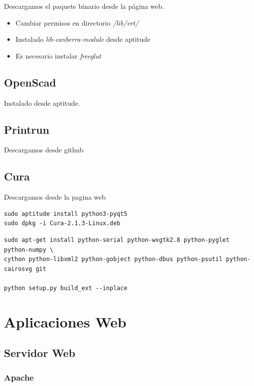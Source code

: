 \documentclass[12pt,spanish,]{scrartcl}
\providecommand{\tightlist}{%
  \setlength{\itemsep}{0pt}\setlength{\parskip}{0pt}}
\begin{document}
Descargamos el paquete binario desde la página web.

\begin{itemize}
\tightlist
\item
  Cambiar permisos en directorio \emph{/lib/vrt/}
\item
  Instalado \emph{lib-canberra-module} desde aptitude
\item
  Es necesario instalar \emph{freeglut}
\end{itemize}

\subsection{OpenScad}\label{openscad}

Instalado desde aptitude.

\subsection{Printrun}\label{printrun}

Descargamos desde github

\subsection{Cura}\label{cura}

Descargamos desde la pagina web

\begin{verbatim}
sudo aptitude install python3-pyqt5
sudo dpkg -i Cura-2.1.3-Linux.deb
\end{verbatim}

\begin{verbatim}
sudo apt-get install python-serial python-wxgtk2.8 python-pyglet python-numpy \
cython python-libxml2 python-gobject python-dbus python-psutil python-cairosvg git

python setup.py build_ext --inplace
\end{verbatim}

\section{Aplicaciones Web}\label{aplicaciones-web}

\subsection{Servidor Web}\label{servidor-web}

\subsubsection{Apache}\label{apache}
\end{document}
